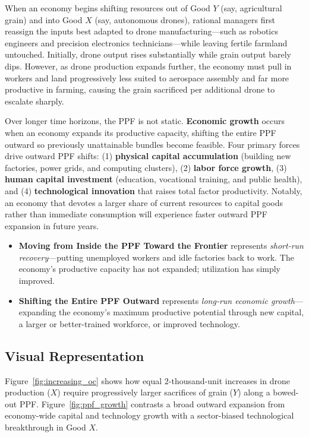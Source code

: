 \documentclass[11pt,letterpaper]{article}
\begin{document}
When an economy begins shifting resources out of Good $Y$ (say, agricultural grain) and into Good $X$ (say, autonomous drones), rational managers first reassign the inputs best adapted to drone manufacturing—such as robotics engineers and precision electronics technicians—while leaving fertile farmland untouched. Initially, drone output rises substantially while grain output barely dips. However, as drone production expands further, the economy must pull in workers and land progressively less suited to aerospace assembly and far more productive in farming, causing the grain sacrificed per additional drone to escalate sharply.

Over longer time horizons, the PPF is not static. \textbf{Economic growth} occurs when an economy expands its productive capacity, shifting the entire PPF outward so previously unattainable bundles become feasible. Four primary forces drive outward PPF shifts: (1) \textbf{physical capital accumulation} (building new factories, power grids, and computing clusters), (2) \textbf{labor force growth}, (3) \textbf{human capital investment} (education, vocational training, and public health), and (4) \textbf{technological innovation} that raises total factor productivity. Notably, an economy that devotes a larger share of current resources to capital goods rather than immediate consumption will experience faster outward PPF expansion in future years.

\begin{coreprinciple}
\begin{itemize}
    \item \textbf{Moving from Inside the PPF Toward the Frontier} represents \emph{short-run recovery}—putting unemployed workers and idle factories back to work. The economy's productive capacity has not expanded; utilization has simply improved.
    \item \textbf{Shifting the Entire PPF Outward} represents \emph{long-run economic growth}—expanding the economy's maximum productive potential through new capital, a larger or better-trained workforce, or improved technology.
\end{itemize}
\end{coreprinciple}

\subsection*{Visual Representation}
Figure~\ref{fig:increasing_oc} shows how equal $2$-thousand-unit increases in drone production ($X$) require progressively larger sacrifices of grain ($Y$) along a bowed-out PPF. Figure~\ref{fig:ppf_growth} contrasts a broad outward expansion from economy-wide capital and technology growth with a sector-biased technological breakthrough in Good $X$.
\end{document}
